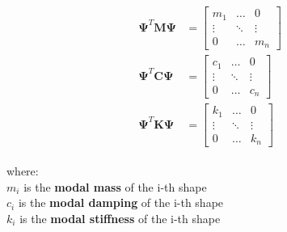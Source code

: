 \documentclass[10pt,b5paper,titlepage]{book}
\newenvironment{ematrix}
{
    \begin{eqnarray}
        \begin{aligned}
}
{
        \end{aligned}
    \end{eqnarray}
}
\begin{document}
\begin{ematrix}
    \mathbf{\Psi}^T \mathbf{M} \mathbf{\Psi}
    &= \begin{bmatrix}
        m_1 & \dots & 0 \\
        \vdots & \ddots & \vdots \\
        0 & \dots & m_n
    \end{bmatrix} \\
    \mathbf{\Psi}^T \mathbf{C} \mathbf{\Psi}
    &= \begin{bmatrix}
        c_1 & \dots & 0 \\
        \vdots & \ddots & \vdots \\
        0 & \dots & c_n
    \end{bmatrix} \\
    \mathbf{\Psi}^T \mathbf{K} \mathbf{\Psi}
    &= \begin{bmatrix}
        k_1 & \dots & 0 \\
        \vdots & \ddots & \vdots \\
        0 & \dots & k_n
    \end{bmatrix}
\end{ematrix}

where: \\
$ m_i $ is the \textbf{modal mass} of the i-th shape\\
$ c_i $ is the \textbf{modal damping} of the i-th shape\\
$ k_i $ is the \textbf{modal stiffness} of the i-th shape
\end{document}
